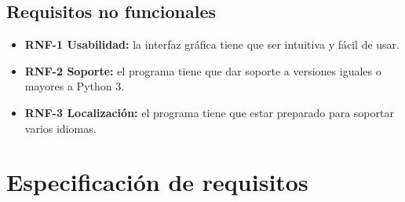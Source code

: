 \subsection{Requisitos no funcionales}
\begin{itemize}
\tightlist
\item \textbf{RNF-1 Usabilidad:} la interfaz gráfica tiene que ser intuitiva y fácil de usar.
\item \textbf{RNF-2 Soporte:} el programa tiene que dar soporte a versiones iguales o mayores a Python 3.
\item \textbf{RNF-3 Localización:} el programa tiene que estar preparado para soportar varios idiomas.
\end{itemize}

\section{Especificación de requisitos}


